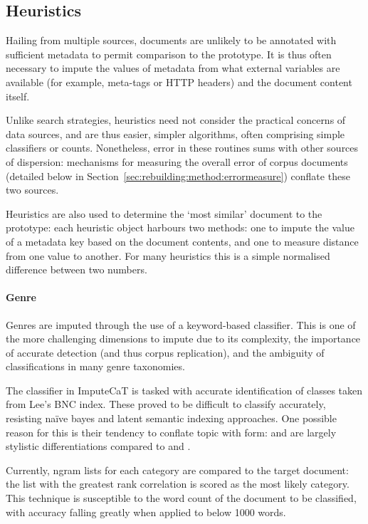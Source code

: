 \subsection{Heuristics}
Hailing from multiple sources, documents are unlikely to be annotated with sufficient metadata to permit comparison to the prototype.  It is thus often necessary to impute the values of metadata from what external variables are available (for example, meta-tags or HTTP headers) and the document content itself.

Unlike search strategies, heuristics need not consider the practical concerns of data sources, and are thus easier, simpler algorithms, often comprising simple classifiers or counts.  Nonetheless, error in these routines sums with other sources of dispersion: mechanisms for measuring the overall error of corpus documents (detailed below in Section~\ref{sec:rebuilding:method:errormeasure}) conflate these two sources.

Heuristics are also used to determine the `most similar' document to the prototype: each heuristic object harbours two methods: one to impute the value of a metadata key based on the document contents, and one to measure distance from one value to another.  For many heuristics this is a simple normalised difference between two numbers.


\paragraph{Genre}
Genres are imputed through the use of a keyword-based classifier.  This is one of the more challenging dimensions to impute due to its complexity, the importance of accurate detection (and thus corpus replication), and the ambiguity of classifications in many genre taxonomies.


The classifier in ImputeCaT is tasked with accurate identification of classes taken from Lee's BNC index.  These proved to be difficult to classify accurately, resisting na\"ive bayes and latent semantic indexing approaches.  One possible reason for this is their tendency to conflate topic with form:  and  are largely stylistic differentiations compared to  and .

Currently, ngram lists for each category are compared to the target document: the list with the greatest rank correlation is scored as the most likely category.  This technique is susceptible to the word count of the document to be classified, with accuracy falling greatly when applied to below 1000 words.  


